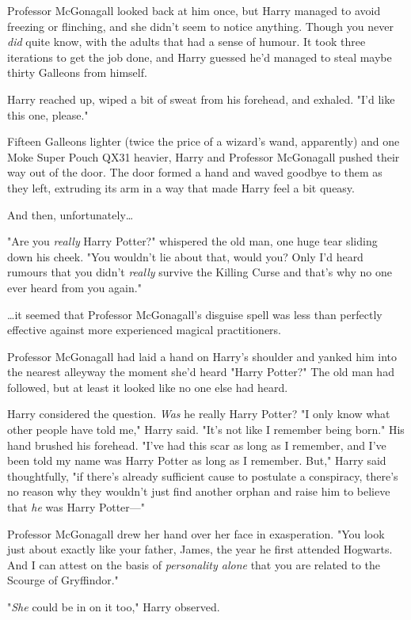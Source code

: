 Professor McGonagall looked back at him once, but Harry managed to avoid 
freezing or flinching, and she didn't seem to notice anything. Though you never 
\emph{did} quite know, with the adults that had a sense of humour. It took 
three iterations to get the job done, and Harry guessed he'd managed to steal 
maybe thirty Galleons from himself.

Harry reached up, wiped a bit of sweat from his forehead, and exhaled. "I'd 
like this one, please."

Fifteen Galleons lighter (twice the price of a wizard's wand, apparently) and 
one Moke Super Pouch QX31 heavier, Harry and Professor McGonagall pushed their 
way out of the door. The door formed a hand and waved goodbye to them as they 
left, extruding its arm in a way that made Harry feel a bit queasy.

And then, unfortunately{\ldots}

"Are you \emph{really} Harry Potter?" whispered the old man, one huge tear 
sliding down his cheek. "You wouldn't lie about that, would you? Only I'd heard 
rumours that you didn't \emph{really} survive the Killing Curse and that's why 
no one ever heard from you again."

{\ldots}it seemed that Professor McGonagall's disguise spell was less than 
perfectly effective against more experienced magical practitioners.

Professor McGonagall had laid a hand on Harry's shoulder and yanked him into 
the nearest alleyway the moment she'd heard "Harry Potter?" The old man had 
followed, but at least it looked like no one else had heard.

Harry considered the question. \emph{Was} he really Harry Potter? "I only know 
what other people have told me," Harry said. "It's not like I remember being 
born." His hand brushed his forehead. "I've had this scar as long as I 
remember, and I've been told my name was Harry Potter as long as I remember. 
But," Harry said thoughtfully, "if there's already sufficient cause to 
postulate a conspiracy, there's no reason why they wouldn't just find another 
orphan and raise him to believe that \emph{he} was Harry Potter---"

Professor McGonagall drew her hand over her face in exasperation. "You look 
just about exactly like your father, James, the year he first attended 
Hogwarts. And I can attest on the basis of \emph{personality alone} that you 
are related to the Scourge of Gryffindor."

"\emph{She} could be in on it too," Harry observed.

